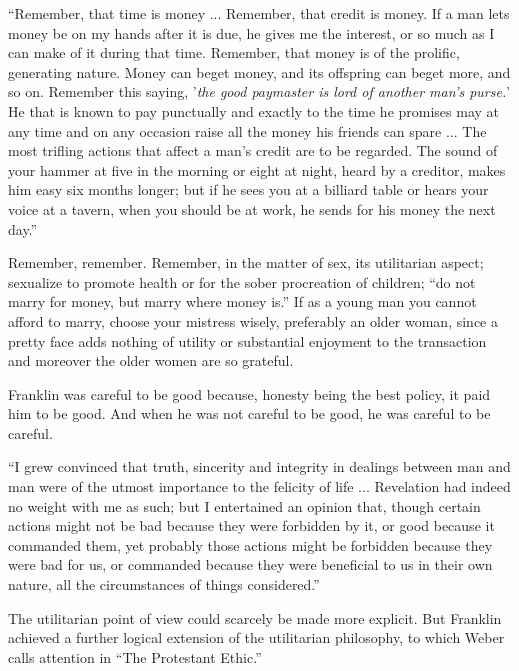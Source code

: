 \documentclass[nohyper,openany,nobib]{tufte-book}
\begin{document}
``Remember, that time is money ... Remember, that credit is money. If a
man lets money be on my hands after it is due, he gives me the interest,
or so much as I can make of it during that time. Remember, that money is
of the prolific, generating nature. Money can beget money, and its
offspring can beget more, and so on. Remember this saying, '\emph{the
good paymaster is lord of another man's purse.}' He that is known to pay
punctually and exactly to the time he promises may at any time and on
any occasion raise all the money his friends can spare ... The most
trifling actions that affect a man's credit are to be regarded. The
sound of your hammer at five in the morning or eight at night, heard by
a creditor, makes him easy six months longer; but if he sees you at a
billiard table or hears your voice at a tavern, when you should be at
work, he sends for his money the next day.''

Remember, remember. Remember, in the matter of sex, its utilitarian
aspect; sexualize to promote health or for the sober procreation of
children; ``do not marry for money, but marry where money is.'' If as a
young man you cannot afford to marry, choose your mistress wisely,
preferably an older woman, since a pretty face adds nothing of utility
or substantial enjoyment to the transaction and moreover the older women
are so grateful.

Franklin was careful to be good because, honesty being the best policy,
it paid him to be good. And when he was not careful to be good, he was
careful to be careful.

``I grew convinced that truth, sincerity and integrity in dealings
between man and man were of the utmost importance to the felicity of
life ... Revelation had indeed no weight with me as such; but I
entertained an opinion that, though certain actions might not be bad
because they were forbidden by it, or good because it commanded them,
yet probably those actions might be forbidden because they were bad for
us, or commanded because they were beneficial to us in their own nature,
all the circumstances of things considered.''

The utilitarian point of view could scarcely be made more explicit. But
Franklin achieved a further logical extension of the utilitarian
philosophy, to which Weber calls attention in ``The Protestant Ethic.''
\end{document}
